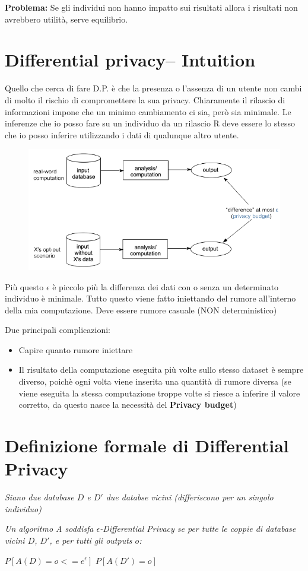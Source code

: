 \documentclass{report}
\begin{document}
\noindent \textbf{Problema:} Se gli individui non hanno impatto sui risultati allora i risultati non avrebbero utilità, serve equilibrio.

\section{Differential privacy– Intuition}
Quello che cerca di fare D.P. è che la presenza o l'assenza di un utente non cambi di molto il rischio di compromettere la sua privacy.
Chiaramente il rilascio di informazioni impone che un minimo cambiamento ci sia, però sia minimale.
Le inferenze che io posso fare su un individuo da un rilascio R deve essere lo stesso che io posso inferire utilizzando i dati di qualunque altro utente.
\begin{figure}[H]
        \centering
        \includegraphics[width=0.6\linewidth]{images/intuition.png}
    \end{figure}

\noindent Più questo $\epsilon$ è piccolo più la differenza dei dati con o senza un determinato individuo è minimale.
Tutto questo viene fatto iniettando del rumore all'interno della mia computazione. Deve essere rumore casuale (NON deterministico)

\noindent Due principali complicazioni:
\begin{itemize}
    \item Capire quanto rumore iniettare
    \item Il risultato della computazione eseguita più volte sullo stesso dataset è sempre diverso, poichè ogni volta viene inserita una quantità di rumore diversa (se viene eseguita la stessa computazione troppe volte si riesce a inferire il valore corretto, da questo nasce
    la necessità del \textbf{Privacy budget})
\end{itemize}

\section{Definizione formale di Differential Privacy}
\textit{Siano due database $D$ e $D'$ due databse vicini (differiscono per un singolo individuo)}
\begin{center}
   \textit{Un algoritmo A soddisfa $\epsilon$-Differential Privacy se per tutte le coppie di database vicini
   $D$, $D'$, e per tutti  gli outputs $o$:}
   
   $P[A(D)= o <= e^\epsilon ]$ $P[A(D')= o]$ 
\end{center}
\end{document}
